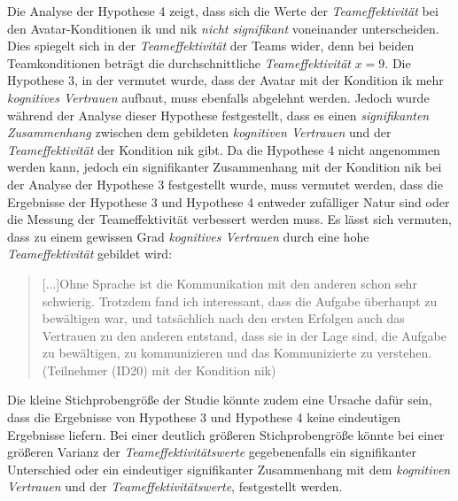 \documentclass[a4paper,11pt]{article}%
\renewcommand{\\}{\vspace*{0.5\baselineskip} \newline}
\begin{document}
{{Die Analyse der Hypothese 4 zeigt, dass sich die Werte der \textit{Teameffektivität} bei den Avatar-Konditionen \ac{ik} und \ac{nik} \textit{nicht signifikant} voneinander unterscheiden. Dies spiegelt sich in der \textit{Teameffektivität} der Teams wider, denn bei beiden Teamkonditionen beträgt die durchschnittliche \textit{Teameffektivität} $x = 9$.
Die Hypothese 3, in der vermutet wurde, dass der Avatar mit der Kondition \ac{ik} mehr \textit{kognitives Vertrauen} aufbaut, muss ebenfalls abgelehnt werden. Jedoch wurde während der Analyse dieser Hypothese festgestellt, dass es einen \textit{signifikanten Zusammenhang} zwischen dem gebildeten \textit{kognitiven Vertrauen} und der \textit{Teameffektivität} der Kondition \ac{nik} gibt. Da die Hypothese 4 nicht angenommen werden kann, jedoch ein signifikanter Zusammenhang mit der Kondition \ac{nik} bei der Analyse der Hypothese 3 festgestellt wurde, muss vermutet werden, dass die Ergebnisse der Hypothese 3 und Hypothese 4 entweder zufälliger Natur sind oder die Messung der Teameffektivität verbessert werden muss.
Es lässt sich vermuten, dass zu einem gewissen Grad \textit{kognitives Vertrauen} durch eine hohe \textit{Teameffektivität} gebildet wird: 
\begin{quote}
\glqq{}[...]Ohne Sprache ist die Kommunikation mit den anderen schon sehr schwierig. Trotzdem fand ich interessant, dass die Aufgabe überhaupt zu bewältigen war, und tatsächlich nach den ersten Erfolgen auch das Vertrauen zu den anderen entstand, dass sie in der Lage sind, die Aufgabe zu bewältigen, zu kommunizieren und das Kommunizierte zu verstehen.\dq{} (Teilnehmer (ID20) mit der Kondition \ac{nik}) 
\end{quote}

Die kleine Stichprobengröße der Studie könnte zudem eine Ursache dafür sein, dass die Ergebnisse von Hypothese 3 und Hypothese 4 keine eindeutigen Ergebnisse liefern. Bei einer deutlich größeren Stichprobengröße könnte bei einer größeren Varianz der \textit{Teameffektivitätswerte} gegebenenfalls ein signifikanter Unterschied oder ein eindeutiger signifikanter Zusammenhang mit dem \textit{kognitiven Vertrauen} und der \textit{Teameffektivitätswerte}, festgestellt werden.

}}
\end{document}
